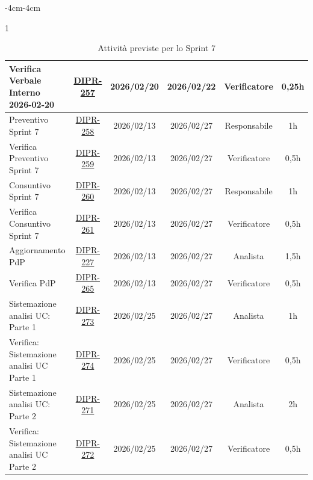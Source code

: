 \documentclass[a4paper,12pt]{article}
\begin{document}
\begin{table}[H]
\begin{adjustwidth}{-4cm}{-4cm}
\begin{spacing}{1}
\begin{tabular}{|p{4cm}|c|c|c|c|c|}
        \hline
        Verifica Verbale Interno 2026-02-20 & \href{https://7zpus.atlassian.net/browse/DIPR-257}{DIPR-257} & 2026/02/20 & 2026/02/22 & Verificatore & 0,25h \\
        \hline
        Preventivo Sprint 7 & \href{https://7zpus.atlassian.net/browse/DIPR-258}{DIPR-258} & 2026/02/13 & 2026/02/27 & Responsabile & 1h \\
        \hline
        Verifica Preventivo Sprint 7 & \href{https://7zpus.atlassian.net/browse/DIPR-259}{DIPR-259} & 2026/02/13 & 2026/02/27 & Verificatore & 0,5h \\
        \hline
        Consuntivo Sprint 7 & \href{https://7zpus.atlassian.net/browse/DIPR-260}{DIPR-260} & 2026/02/13 & 2026/02/27 & Responsabile & 1h \\
        \hline
        Verifica Consuntivo Sprint 7 & \href{https://7zpus.atlassian.net/browse/DIPR-261}{DIPR-261} & 2026/02/13 & 2026/02/27 & Verificatore & 0,5h \\
        \hline
        Aggiornamento PdP & \href{https://7zpus.atlassian.net/browse/DIPR-227}{DIPR-227} & 2026/02/13 & 2026/02/27 & Analista & 1,5h \\
        \hline
        Verifica PdP & \href{https://7zpus.atlassian.net/browse/DIPR-265}{DIPR-265} & 2026/02/13 & 2026/02/27 & Verificatore & 0,5h \\
        \hline
        Sistemazione analisi UC: Parte 1 & \href{https://7zpus.atlassian.net/browse/DIPR-273}{DIPR-273} & 2026/02/25 & 2026/02/27 & Analista & 1h \\
        \hline
        Verifica: Sistemazione analisi UC Parte 1 & \href{https://7zpus.atlassian.net/browse/DIPR-274}{DIPR-274} & 2026/02/25 & 2026/02/27 & Verificatore & 0,5h \\
        \hline
        Sistemazione analisi UC: Parte 2 & \href{https://7zpus.atlassian.net/browse/DIPR-271}{DIPR-271} & 2026/02/25 & 2026/02/27 & Analista & 2h \\
        \hline
        Verifica: Sistemazione analisi UC Parte 2 & \href{https://7zpus.atlassian.net/browse/DIPR-272}{DIPR-272} & 2026/02/25 & 2026/02/27 & Verificatore & 0,5h \\
        \hline

    \end{tabular}
    \end{spacing}
    \caption{Attività previste per lo Sprint 7}
    \end{adjustwidth}
\end{table}
\end{document}
